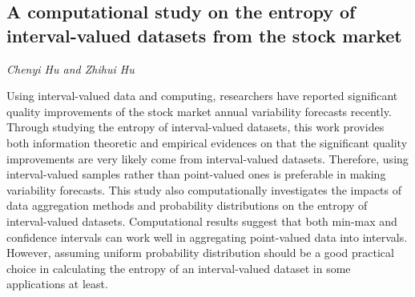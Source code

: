 \documentclass[../booklet.tex]{subfiles}
\begin{document}
\subsection[A computational study on the entropy of interval-valued datasets from the stock market. {\it Chenyi Hu and Zhihui Hu}]{A computational study on the entropy of interval-valued datasets from the stock market}
 

\begin{center}
  {\it Chenyi Hu and Zhihui Hu}
\end{center}

\vskip 0.8cm


Using interval-valued data and computing, researchers have reported significant quality improvements of the stock market annual variability forecasts recently. Through studying the entropy of interval-valued datasets, this work provides both information theoretic and empirical evidences on that the significant quality improvements are very likely come from interval-valued datasets.  
Therefore, using interval-valued samples rather than point-valued ones is preferable in making variability forecasts. 
This study also computationally investigates the impacts of data aggregation methods and probability distributions on the entropy of interval-valued datasets. Computational results suggest that both min-max and confidence intervals can work well in aggregating point-valued data into intervals. However, assuming uniform probability distribution should be a good practical choice in calculating the entropy of an interval-valued dataset in some applications at least. %
\end{document}
